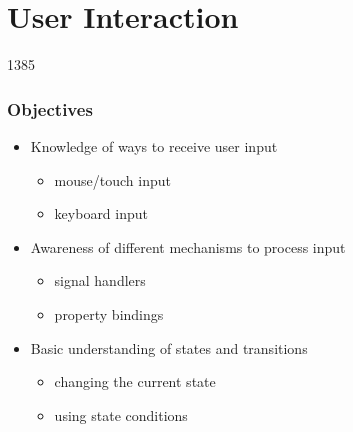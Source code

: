 %
%
%
%

\section{User Interaction}

\begin{slide}{1385}\frametitle{Objectives}

\begin{itemize}
\item Knowledge of ways to receive user input
  \begin{itemize}
  \item mouse/touch input
  \item keyboard input
  \end{itemize}
\item Awareness of different mechanisms to process input
  \begin{itemize}
  \item signal handlers
  \item property bindings
  \end{itemize}
\item Basic understanding of states and transitions
  \begin{itemize}
  \item changing the current state
  \item using state conditions
  \end{itemize}
\end{itemize}

\end{slide}    




